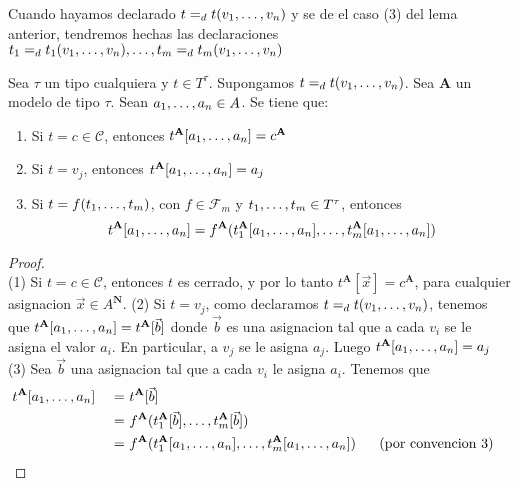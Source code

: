 \begin{convention}
  Cuando hayamos declarado $t =_d t(v_{1}, \dots, v_{n})$ y se de el caso (3) del lema anterior,
  tendremos hechas las declaraciones $t_1 =_d t_1(v_{1}, \dots, v_{n}), \dots, t_m =_d t_m(v_{1}, \dots, v_{n})$
\end{convention}

\begin{lemma}
  Sea $\tau$ un tipo cualquiera y $t \in T^\tau$. Supongamos $t =_d t(v_{1}, \dots, v_{n})$. Sea
  $\mathbf{A}$ un modelo de tipo $\tau$. Sean $a_{1}, \dots, a_{n} \in A$. Se tiene que: \begin{enumerate}
    \item Si $t = c \in \mathcal{C}$, entonces $t^\mathbf{A}[a_{1}, \dots, a_{n}] = c^\mathbf{A}$
    \item Si $t = v_j$, entonces $t^\mathbf{A}[a_{1}, \dots, a_{n}] = a_j$
    \item Si $t = f(t_{1}, \dots, t_{m})$, con $f \in \mathcal{F}_m$ y $t_{1}, \dots, t_{m} \in T^\tau$, entonces
    $$
    t^\mathbf{A}[a_{1}, \dots, a_{n}] = f^\mathbf{A}(t_1^\mathbf{A}[a_{1}, \dots, a_{n}],\dots, t_m^\mathbf{A}[a_{1}, \dots, a_{n}])
    $$
  \end{enumerate}
\end{lemma}
\begin{proof}
  $ $\\
  (1) Si $t = c \in \mathcal{C}$, entonces $t$ es cerrado, y por lo tanto $t^\mathbf{A}[\vec{x}] = c^\mathbf{A}$, para cualquier asignacion $\vec{x} \in A^\mathbf{N}$.
  (2) Si $t = v_j$, como declaramos $t =_d t(v_{1}, \dots, v_{n})$, tenemos que $t^\mathbf{A}[a_{1}, \dots, a_{n}] = t^\mathbf{A}[\vec{b}]$ donde $\vec{b}$ es una asignacion tal que 
  a cada $v_i$ se le asigna el valor $a_i$. En particular, a $v_j$ se le asigna $a_j$. Luego $t^\mathbf{A}[a_{1}, \dots, a_{n}] = a_j$\\
  (3) Sea $\vec{b}$ una asignacion tal que a cada $v_i$ le asigna $a_i$. Tenemos que
  \begin{alignat*}{3}
    &t^\mathbf{A}[\succession{a}{1}{n}] &\ = &\ t^\mathbf{A}[\vec{b}]\\
    & &\ = &\ f^\mathbf{A}(t_1^\mathbf{A}[\vec{b}], \dots, t_m^\mathbf{A}[\vec{b}])\\
    & &\ = &\ f^\mathbf{A}(t_1^\mathbf{A}[\succession{a}{1}{n}], \dots, t_m^\mathbf{A}[\succession{a}{1}{n}]) &\ &\ \text{(por convencion 3)}
  \end{alignat*}
\end{proof}

